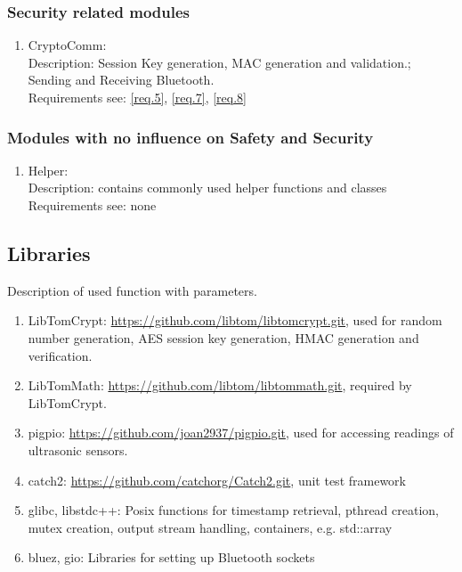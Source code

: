 \subsubsection{Security related modules}

\begin{enumerate}
	\item CryptoComm: \\
		Description: Session Key generation, MAC generation and validation.; Sending and Receiving Bluetooth.\\
		Requirements see: \ref{req.5}, \ref{req.7}, \ref{req.8}\\
\end{enumerate}

\subsubsection{Modules with no influence on Safety and Security}

\begin{enumerate}
	\item Helper: \\
		Description: contains commonly used helper functions and classes \\
		Requirements see: none\\
\end{enumerate}

\subsection{Libraries}

Description of used function with parameters.

\begin{enumerate}
	\item LibTomCrypt: \href{https://github.com/libtom/libtomcrypt.git} {https://github.com/libtom/libtomcrypt.git}, used for random number generation, AES session key generation, HMAC generation and verification.
	\item LibTomMath: \href{https://github.com/libtom/libtommath.git} {https://github.com/libtom/libtommath.git}, required by LibTomCrypt.
	\item pigpio: \href{https://github.com/joan2937/pigpio.git} {https://github.com/joan2937/pigpio.git}, used for accessing readings of ultrasonic sensors.
	\item catch2: \href{https://github.com/catchorg/Catch2.git} {https://github.com/catchorg/Catch2.git}, unit test framework
	\item glibc, libstdc++: Posix functions for timestamp retrieval, pthread creation, mutex creation, output stream handling, containers, e.g. std::array
	\item bluez, gio: Libraries for setting up Bluetooth sockets
\end{enumerate}

